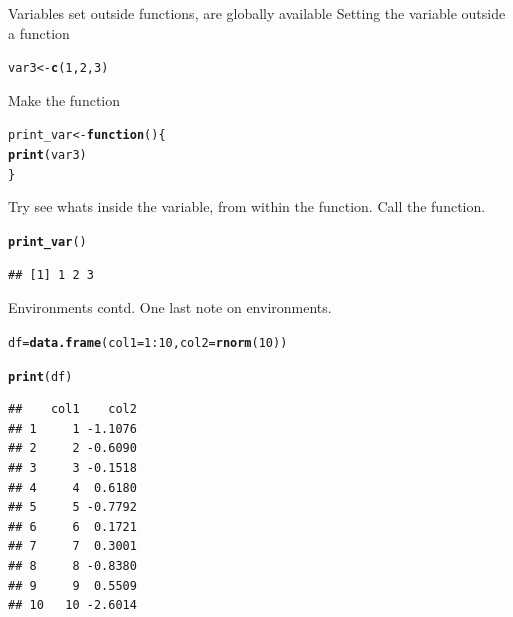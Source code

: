 \documentclass{beamer}\usepackage[]{graphicx}\usepackage[]{color}
\makeatletter
\newcommand{\hlnum}[1]{\textcolor[rgb]{0.686,0.059,0.569}{#1}}%
\newcommand{\hlopt}[1]{\textcolor[rgb]{0,0,0}{#1}}%
\newcommand{\hlstd}[1]{\textcolor[rgb]{0.345,0.345,0.345}{#1}}%
\newcommand{\hlkwa}[1]{\textcolor[rgb]{0.161,0.373,0.58}{\textbf{#1}}}%
\newcommand{\hlkwb}[1]{\textcolor[rgb]{0.69,0.353,0.396}{#1}}%
\newcommand{\hlkwc}[1]{\textcolor[rgb]{0.333,0.667,0.333}{#1}}%
\newcommand{\hlkwd}[1]{\textcolor[rgb]{0.737,0.353,0.396}{\textbf{#1}}}%
\newenvironment{kframe}{%
 \def\at@end@of@kframe{}%
 \ifinner\ifhmode%
  \def\at@end@of@kframe{\end{minipage}}%
  \begin{minipage}{\columnwidth}%
 \fi\fi%
 \def\FrameCommand##1{\hskip\@totalleftmargin \hskip-\fboxsep
 \colorbox{shadecolor}{##1}\hskip-\fboxsep
     \hskip-\linewidth \hskip-\@totalleftmargin \hskip\columnwidth}%
 \MakeFramed {\advance\hsize-\width
   \@totalleftmargin\z@ \linewidth\hsize
   \@setminipage}}%
 {\par\unskip\endMakeFramed%
 \at@end@of@kframe}
\newenvironment{knitrout}{}{} %
\makeatother
\begin{document}
\begin{frame}[fragile]{Variables set outside functions, are globally available}
Setting the variable outside a function
\begin{knitrout}
\color{fgcolor}\begin{kframe}
\begin{alltt}
\hlstd{var3} \hlkwb{<-} \hlkwd{c}\hlstd{(}\hlnum{1}\hlstd{,} \hlnum{2}\hlstd{,} \hlnum{3}\hlstd{)}
\end{alltt}
\end{kframe}
\end{knitrout}

Make the function
\begin{knitrout}
\color{fgcolor}\begin{kframe}
\begin{alltt}
\hlstd{print_var} \hlkwb{<-} \hlkwa{function}\hlstd{() \{}
    \hlkwd{print}\hlstd{(var3)}
\hlstd{\}}
\end{alltt}
\end{kframe}
\end{knitrout}

Try see whats inside the variable, from within the function.
\linebreak
Call the function.
\begin{knitrout}
\color{fgcolor}\begin{kframe}
\begin{alltt}
\hlkwd{print_var}\hlstd{()}
\end{alltt}
\begin{verbatim}
## [1] 1 2 3
\end{verbatim}
\end{kframe}
\end{knitrout}

\end{frame}


\begin{frame}[fragile]{Environments contd.}
One last note on environments.
\begin{knitrout}
\color{fgcolor}\begin{kframe}
\begin{alltt}
\hlstd{df} \hlkwb{=} \hlkwd{data.frame}\hlstd{(}\hlkwc{col1} \hlstd{=} \hlnum{1}\hlopt{:}\hlnum{10}\hlstd{,} \hlkwc{col2} \hlstd{=} \hlkwd{rnorm}\hlstd{(}\hlnum{10}\hlstd{))}

\hlkwd{print}\hlstd{(df)}
\end{alltt}
\begin{verbatim}
##    col1    col2
## 1     1 -1.1076
## 2     2 -0.6090
## 3     3 -0.1518
## 4     4  0.6180
## 5     5 -0.7792
## 6     6  0.1721
## 7     7  0.3001
## 8     8 -0.8380
## 9     9  0.5509
## 10   10 -2.6014
\end{verbatim}
\end{kframe}
\end{knitrout}


\end{frame}
\end{document}
